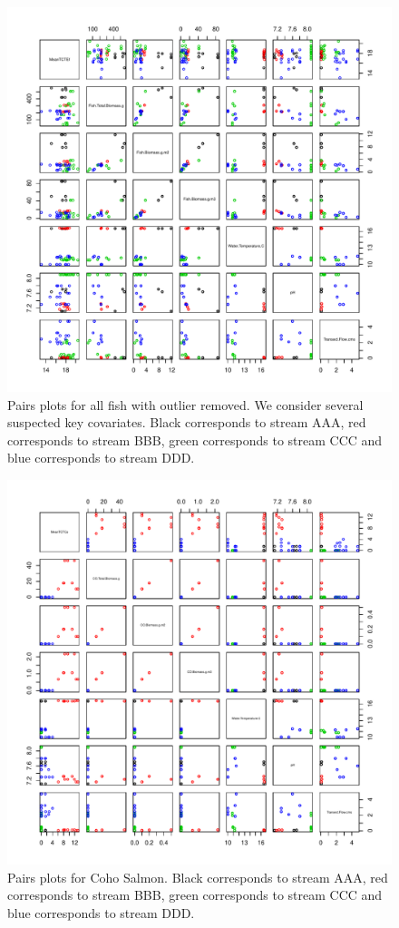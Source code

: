 \begin{figure}[H]
\includegraphics{Chapter5Images/EFishpairs.pdf}
\caption{  \hspace{1mm}  Pairs plots for all fish with outlier removed. We consider several suspected key covariates. Black corresponds to stream AAA, red corresponds to stream BBB, green corresponds to stream CCC and blue corresponds to stream DDD.}
\label{fig:pairef}
\end{figure}


\begin{figure}[H]
\includegraphics{Chapter5Images/Cohopairs.pdf}
\caption{  \hspace{1mm}Pairs plots for Coho Salmon. Black corresponds to stream AAA, red corresponds to stream BBB, green corresponds to stream CCC and blue corresponds to stream DDD.}
\label{fig:pairco}
\end{figure}

